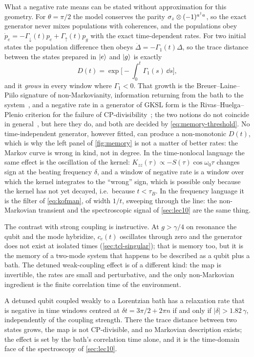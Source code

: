 What a negative rate means can be stated without approximation for this geometry.
For $\theta=\pi/2$ the model conserves the parity $\sigma_z\otimes(-1)^{a^\dagger a}$, so the exact generator never mixes populations with coherences, and the populations obey $\dot p_e=-\Gamma_\downarrow(t)p_e+\Gamma_\uparrow(t)p_g$ with the exact time-dependent rates.
For two initial states the population difference then obeys $\dot\Delta=-\Gamma_1(t)\Delta$, so the trace distance between the states prepared in $|e\rangle$ and $|g\rangle$ is exactly
\begin{equation}
  D(t)=\exp\Big[-\int_0^t\Gamma_1(s)\,\dd s\Big],
  \label{eq:trace-distance}
\end{equation}
and it \emph{grows} in every window where $\Gamma_1<0$.
That growth is the Breuer--Laine--Piilo signature of non-Markovianity, information returning from the bath to the system~\cite{BLP2009}, and a negative rate in a generator of GKSL form is the Rivas--Huelga--Plenio criterion for the failure of CP-divisibility~\cite{RHP2010}; the two notions do not coincide in general~\cite{BLPV2016,deVega2017}, but here they do, and both are decided by \cref{eq:memory-threshold}.
No time-independent generator, however fitted, can produce a non-monotonic $D(t)$, which is why the left panel of \cref{fig:memory} is not a matter of better rates: the Markov curve is wrong in kind, not in degree.
In the time-nonlocal language the same effect is the oscillation of the kernel: $K_{zz}(\tau)\propto-S(\tau)\cos\omega_0\tau$ changes sign at the beating frequency $\delta$, and a window of negative rate is a window over which the kernel integrates to the ``wrong'' sign, which is possible only because the kernel has not yet decayed, i.e.\ because $t<\tau_B$.
In the frequency language it is the filter of \cref{eq:kofman}, of width $1/t$, sweeping through the line: the non-Markovian transient and the spectroscopic signal of \cref{sec:lec10} are the same thing.

The contrast with strong coupling is instructive.
At $g>\gamma/4$ on resonance the qubit and the mode hybridize, $c_e(t)$ oscillates through zero and the generator does not exist at isolated times (\cref{sec:tcl-singular}); that is memory too, but it is the memory of a two-mode system that happens to be described as a qubit plus a bath.
The detuned weak-coupling effect is of a different kind: the map is invertible, the rates are small and perturbative, and the only non-Markovian ingredient is the finite correlation time of the environment.

\begin{keybox}
A detuned qubit coupled weakly to a Lorentzian bath has a relaxation rate that is negative in time windows centred at $\delta t=3\pi/2+2\pi n$ if and only if $|\delta|>1.82\,\gamma$, independently of the coupling strength.
There the trace distance between two states grows, the map is not CP-divisible, and no Markovian description exists; the effect is set by the bath's correlation time alone, and it is the time-domain face of the spectroscopy of \cref{sec:lec10}.
\end{keybox}

